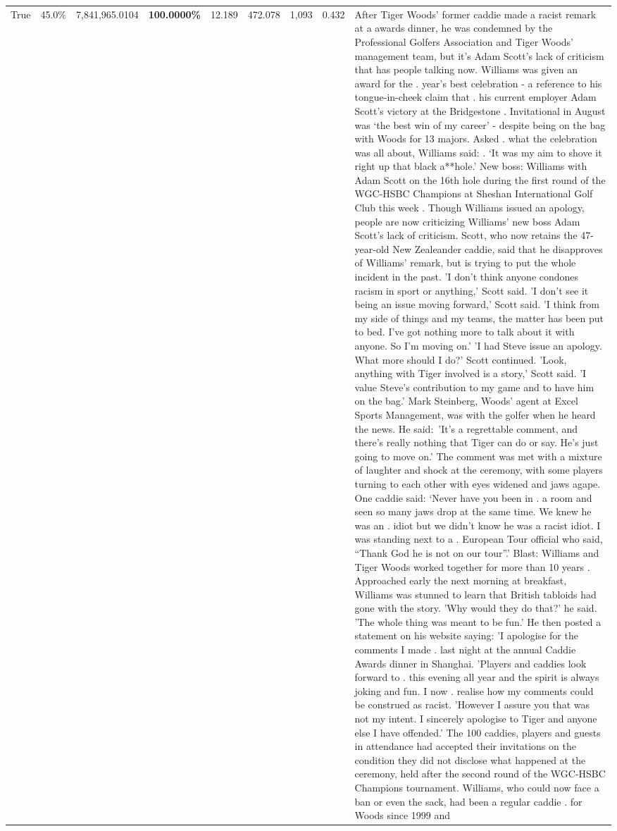 \begin{table}[H]
\begin{tabular}{lllrlllll}
True & 45.0\% & 7,841,965.0104 & \bfseries \color{red} 100.0000\% & 12.189 & 472.078 & 1,093 & 0.432 & After Tiger Woods' former caddie made a racist remark at a awards dinner, he was condemned by the Professional Golfers Association and Tiger Woods' management team, but it's Adam Scott's lack of criticism that has people talking now. Williams was given an award for the . year’s best celebration - a reference to his tongue-in-cheek claim that . his current employer Adam Scott’s victory at the Bridgestone . Invitational in August was ‘the best win of my career’ - despite being on the bag with Woods for 13 majors. Asked . what the celebration was all about, Williams said: . ‘It was my aim to shove it right up that black a**hole.’ New boss: Williams with Adam Scott  on the 16th hole during the first round of the WGC-HSBC Champions at Sheshan International Golf Club this week . Though Williams issued an apology, people are now criticizing Williams' new boss Adam Scott's lack of criticism. Scott, who now retains the 47-year-old New Zealeander caddie, said that he disapproves of Williams' remark, but is trying to put the whole incident in the past. 'I don't think anyone condones racism in sport or anything,' Scott said. 'I don't see it being an issue moving forward,' Scott said. 'I think from my side of things and my teams, the matter has been put to bed. I've got nothing more to talk about it with anyone. So I'm moving on.' 'I had Steve issue an apology. What more should I do?' Scott continued. 'Look, anything with Tiger involved is a story,' Scott said. 'I value Steve's contribution to my game and to have him on the bag.' Mark Steinberg, Woods' agent at Excel Sports Management, was with the golfer when he heard the news. He said: 'It's a regrettable comment, and there's really nothing that Tiger can do or say. He's just going to move on.' The comment was met with a mixture of laughter and shock at the ceremony, with some players turning to each other with eyes widened and jaws agape. One caddie said: ‘Never have you been in . a room and seen so many jaws drop at the same time. We knew he was an . idiot but we didn’t know he was a racist idiot. I was standing next to a . European Tour official who said, “Thank God he is not on our tour”.’ Blast: Williams and Tiger Woods worked together for more than 10 years . Approached early the next morning at breakfast, Williams was stunned to learn that British tabloids had gone with the story. 'Why would they do that?' he said. 'The whole thing was meant to be fun.' He then posted a statement on his website saying: 'I apologise for the comments I made . last night at the annual Caddie Awards dinner in Shanghai. 'Players and caddies look forward to . this evening all year and the spirit is always joking and fun. I now . realise how my comments could be construed as racist. 'However I assure you that was not my intent. I sincerely apologise to Tiger and anyone else I have offended.' The 100 caddies, players and guests in attendance had accepted their invitations on the condition they did not disclose what happened at the ceremony, held after the second round of the WGC-HSBC Champions tournament. Williams, who could now face a ban or even the sack, had been a regular caddie . for Woods since 1999 and 
\end{tabular}
\end{table}
